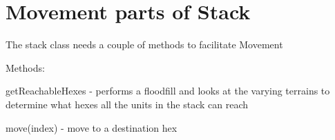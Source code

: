 \section*{Movement parts of Stack}

The stack class needs a couple of methods to facilitate Movement\begin{al}
\item[Methods:] \parbox{\textwidth}{getReachableHexes - performs a floodfill and looks at the varying terrains to determine what hexes all the units in the stack can reach}
	\item[] \parbox{\textwidth}{move(index) - move to a destination hex}
\end{al}

